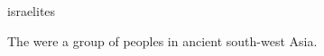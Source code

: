 \documentclass{stex}
\begin{document}
\begin{smodule}{israelites}
\begin{sparagraph}[style=symdoc]
The  were a group of peoples in ancient south-west Asia.
\end{sparagraph}
\end{smodule}
\end{document}
